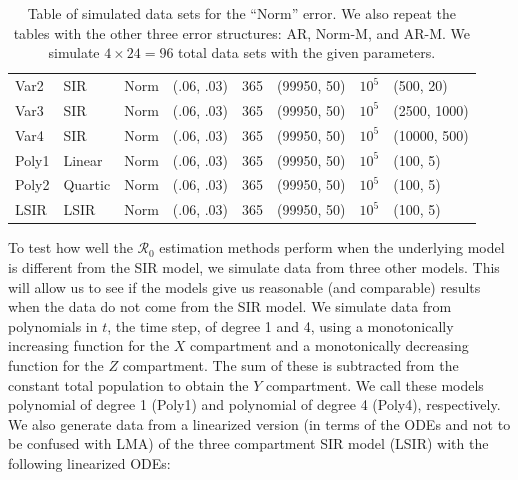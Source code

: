 \documentclass[12pt]{article}
\newcommand{\rr}{\ensuremath{\mathcal{R}_0}}
\begin{document}
\begin{table}[]
\begin{tabular}{@{}llllllll@{}}
  Var2      & SIR      &   Norm             & (.06, .03)                          &     365       &  (99950, 50)                    &  $10^5$          &(500, 20)                                \\
  Var3      & SIR      &   Norm             & (.06, .03)                          &     365       &  (99950, 50)                    &  $10^5$          &(2500, 1000)                                \\
  Var4      & SIR      &   Norm             & (.06, .03)                          &     365       &  (99950, 50)                    &  $10^5$          &(10000, 500)                                \\ \midrule
 Poly1     & Linear      &   Norm             & (.06, .03)                          &     365       &  (99950, 50)                    &  $10^5$          &(100, 5)                            \\
Poly2    & Quartic      &   Norm             & (.06, .03)                          &     365       &  (99950, 50)                    &  $10^5$          &(100, 5)                            \\ 
   LSIR     & LSIR      &   Norm             & (.06, .03)                          &     365       &  (99950, 50)                    &  $10^5$          &(100, 5)                            \\ 
  \bottomrule
\end{tabular}
\caption{Table of simulated data sets for the ``Norm'' error.  We also repeat the tables with the other three error structures: AR, Norm-M, and AR-M.  We simulate $4 \times 24=96$ total data sets with the given parameters.}
\label{tab:simulated-data}
\end{table}

To test how well the $\rr$ estimation methods perform when the underlying model is different from the SIR model, we simulate data from three other models. This will allow us to see if the models give us reasonable (and comparable) results when the data do not come from the SIR model. We simulate data from polynomials in $t$, the time step, of degree 1 and 4, using a monotonically increasing function for the $X$ compartment and a monotonically decreasing function for the $Z$ compartment.   The sum of these is subtracted from the constant total population to obtain the $Y$ compartment. We call these models polynomial of degree 1 (Poly1) and polynomial of degree 4 (Poly4), respectively. We also generate data from a linearized version (in terms of the ODEs and not to be confused with LMA) of the three compartment SIR model (LSIR) with the following linearized ODEs:
\end{document}
